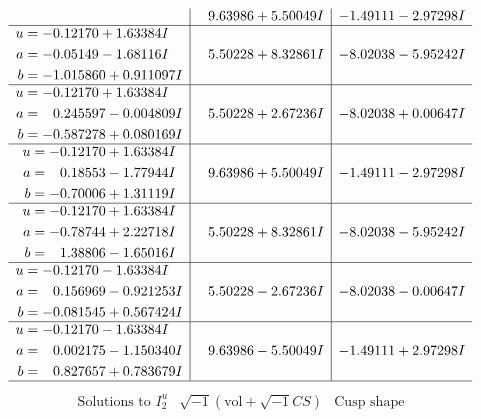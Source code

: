 \documentclass[1p]{elsarticle_modified}
\theoremstyle{definition}
\newcommand{\I}{\sqrt{-1}}
\begin{document}
$$\begin{array}{c|c|c}
 & \phantom{-}9.63986 + 5.50049 I & -1.49111 - 2.97298 I \\ \hline\begin{aligned}
u &= -0.12170 + 1.63384 I \\
a &= -0.05149 - 1.68116 I \\
b &= -1.015860 + 0.911097 I\end{aligned}
 & \phantom{-}5.50228 + 8.32861 I & -8.02038 - 5.95242 I \\ \hline\begin{aligned}
u &= -0.12170 + 1.63384 I \\
a &= \phantom{-}0.245597 - 0.004809 I \\
b &= -0.587278 + 0.080169 I\end{aligned}
 & \phantom{-}5.50228 + 2.67236 I & -8.02038 + 0.00647 I \\ \hline\begin{aligned}
u &= -0.12170 + 1.63384 I \\
a &= \phantom{-}0.18553 - 1.77944 I \\
b &= -0.70006 + 1.31119 I\end{aligned}
 & \phantom{-}9.63986 + 5.50049 I & -1.49111 - 2.97298 I \\ \hline\begin{aligned}
u &= -0.12170 + 1.63384 I \\
a &= -0.78744 + 2.22718 I \\
b &= \phantom{-}1.38806 - 1.65016 I\end{aligned}
 & \phantom{-}5.50228 + 8.32861 I & -8.02038 - 5.95242 I \\ \hline\begin{aligned}
u &= -0.12170 - 1.63384 I \\
a &= \phantom{-}0.156969 - 0.921253 I \\
b &= -0.081545 + 0.567424 I\end{aligned}
 & \phantom{-}5.50228 - 2.67236 I & -8.02038 - 0.00647 I \\ \hline\begin{aligned}
u &= -0.12170 - 1.63384 I \\
a &= \phantom{-}0.002175 - 1.150340 I \\
b &= \phantom{-}0.827657 + 0.783679 I\end{aligned}
 & \phantom{-}9.63986 - 5.50049 I & -1.49111 + 2.97298 I\\
 \hline 
 \end{array}$$\newpage$$\begin{array}{c|c|c}  
\text{Solutions to }I^u_{2}& \I (\text{vol} + \sqrt{-1}CS) & \text{Cusp shape}\\

\end{array}$$
\end{document}
